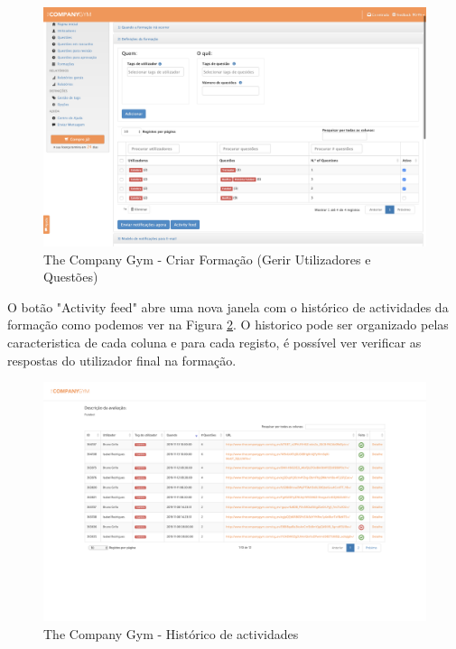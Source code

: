 \begin{figure}[ht!]
	\begin{center}
		\includegraphics[width=1\textwidth]{img/tcg/tcg-form2.png}
		\caption{The Company Gym - Criar Formação (Gerir Utilizadores e Questões)}
		\label{fig:tcg-form2}
	\end{center}
\end{figure}

O botão "Activity feed" abre uma nova janela com o histórico de actividades da formação como podemos ver na Figura \ref{fig:tcg-feed}. O historico pode ser organizado pelas caracteristica de cada coluna e para cada registo, é possível ver verificar as respostas do utilizador final na formação.


\begin{figure}[ht!]
	\begin{center}
		\includegraphics[width=1\textwidth]{img/tcg/tcg-feed.png}
		\caption{The Company Gym - Histórico de actividades}
		\label{fig:tcg-feed}
	\end{center}
\end{figure}

